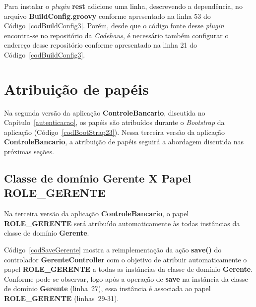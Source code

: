 \vspace{1cm}

Para  instalar o  {\it  plugin} {\bf  rest}  adicione uma  linha, descrevendo  a
dependência, no  arquivo {\bf BuildConfig.groovy} conforme  apresentado na linha
53 do Código~\ref{codBuildConfig3}.  Porém, desde  que o código fonte desse {\it
  plugin}  encontra-se no  repositório da  {\it Codehaus},  é  necessário também
configurar  o endereço  desse repositório  conforme apresentado  na linha  21 do
Código~\ref{codBuildConfig3}.  

\newpage

\section{Atribuição de papéis}

\vspace{0.5cm}

Na   segunda  versão   da   aplicação  {\bf   ControleBancario},  discutida   no
Capítulo~\ref{autenticacao}, os papéis são  atribuídos durante o {\it Bootstrap}
da aplicação  (Código~\ref{codBootStrap23}). Nessa terceira  versão da aplicação
{\bf ControleBancario}, a atribuição de papéis seguirá a abordagem discutida nas
próximas seções. 

\subsection{Classe de domínio Gerente X Papel {\bf ROLE\_GERENTE}}

\vspace{0.5cm}

Na  terceira   versão  da  aplicação   {\bf  ControleBancario},  o   papel  {\bf
  ROLE\_GERENTE} será atribuído automaticamente às todas instâncias da classe de
domínio {\bf Gerente}.  

Código~\ref{codSaveGerente}  mostra a  reimplementação da  ação {\bf  save()} do
controlador {\bf GerenteController} com o objetivo de atribuir automaticamente o 
papel  {\bf ROLE\_GERENTE}  a  todas as  instâncias  da classe  de domínio  {\bf
  Gerente}. Conforme  pode-se observar,  logo após a  operação de {\bf  save} na
instância  da classe  de  domínio  {\bf Gerente}  (linha~27),  essa instância  é
associada ao papel {\bf ROLE\_GERENTE} (linhas~29-31). 

